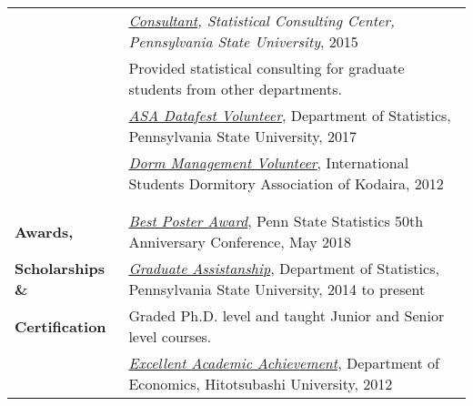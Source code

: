 \documentclass[utf8,letterpaper,oneside]{article}
\begin{document}
\begin{center}
\begin{tabular}{l l}
                           & \textit{\underline{{Consultant}}, Statistical Consulting Center, Pennsylvania State University}, 2015                                            \\
                           & Provided statistical consulting for graduate students from other departments.                                                                    \\
                           & \underline{\textit{ASA Datafest {Volunteer}}}, Department of Statistics, Pennsylvania State University, 2017                                     \\
                           & \underline{\textit{Dorm Management {Volunteer}}}, International Students Dormitory Association of Kodaira, 2012                                  \\
                           &                                                                                                                                                  
  \\\hline
                           &                                                                                                                                                  \\
  \textbf{Awards, }        & \underline{{\textit{Best Poster Award}}}, Penn State Statistics 50th Anniversary Conference, May 2018                                            \\
  \textbf{Scholarships \&} & \underline{\textit{Graduate Assistanship}}, Department of Statistics, Pennsylvania State University, 2014 to present                             \\
  \textbf{Certification}   & {Graded Ph.D. level} and {taught Junior and Senior level} courses.                                                                               \\
                           & \underline{{\textit{Excellent Academic Achievement}}}, Department of Economics, Hitotsubashi University, 2012                                    \\
  

\end{tabular}
\end{center}
\end{document}
